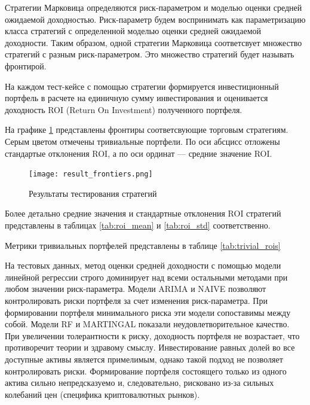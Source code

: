Стратегии Марковица определяются риск-параметром и моделью оценки средней ожидаемой доходностью.
Риск-параметр будем воспринимать как параметризацию класса стратегий с определенной моделью оценки средней ожидаемой доходности.
Таким образом, одной стратегии Марковица соответсвует множество стратегий с разным риск-параметром. 
Это множество стратегий будет называть фронтирой.

На каждом тест-кейсе с помощью стратегии формируется инвестиционный портфель
в расчете на единичную сумму инвестирования и оценивается доходность ROI (Return On Investment) полученного портфеля.

На графике \ref{fig:result_frontier} представлены фронтиры соответсвующие торговым стратегиям.
Серым цветом отмечены тривиальные портфели.
По оси абсцисс отложены стандартые отклонения ROI, а по оси ординат --- средние значение ROI.

\begin{figure}[H]
	\centering
	\texttt{[image: result\_frontiers.png]}
	\caption{Результаты тестирования стратегий}
	\label{fig:result_frontier}
\end{figure}

Более детально средние значения и стандартные отклонения ROI стратегий представлены в таблицах
\ref{tab:roi_mean} и \ref{tab:roi_std} соответственно.

Метрики тривиальных портфелей представлены в таблице \ref{tab:trivial_rois}







На тестовых данных, метод оценки средней доходности с помощью модели линейной регрессии строго доминирует над всеми остальными методами
при любом значении риск-параметра. Модели ARIMA и NAIVE позволяют контролировать риски портфеля за счет изменения риск-параметра.
При формировании портфеля минимального риска эти модели сопоставимы между собой.
Модели RF и MARTINGAL показали неудовлетворительное качество. При увеличении толерантности к риску, доходность портфеля не возрастает,
что противоречит теории и здравому смыслу.
Инвестирование равных долей во все доступные активы является примелимым, однако такой подход не позволяет контролировать риски.
Формирование портфеля состоящего только из одного актива сильно непредсказуемо и, следовательно, рисковано 
из-за сильных колебаний цен (специфика криптовалютных рынков).
